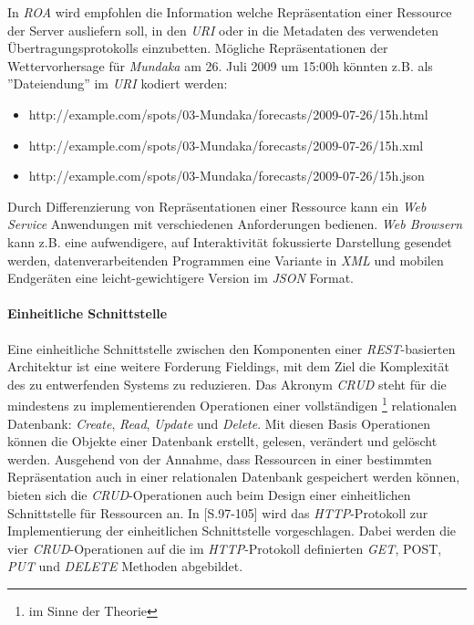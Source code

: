 In \textit{ROA} wird empfohlen die Information welche Repräsentation
einer Ressource der Server ausliefern soll, in den \textit{URI} oder
in die Metadaten des verwendeten Übertragungsprotokolls
einzubetten. Mögliche Repräsentationen der Wettervorhersage für
\textit{Mundaka} am 26. Juli 2009 um 15:00h könnten z.B. als
''Dateiendung'' im \textit{URI} kodiert werden:

\begin{itemize}
\item http://example.com/spots/03-Mundaka/forecasts/2009-07-26/15h.html
\item http://example.com/spots/03-Mundaka/forecasts/2009-07-26/15h.xml
\item http://example.com/spots/03-Mundaka/forecasts/2009-07-26/15h.json
\end{itemize}

Durch Differenzierung von Repräsentationen einer Ressource kann ein
\textit{Web Service} Anwendungen mit verschiedenen Anforderungen
bedienen. \textit{Web Browsern} kann z.B. eine aufwendigere, auf
Interaktivität fokussierte Darstellung gesendet werden,
datenverarbeitenden Programmen eine Variante in \textit{XML} und
mobilen Endgeräten eine leicht-gewichtigere Version im \textit{JSON}
Format.

\paragraph{Einheitliche Schnittstelle}

Eine einheitliche Schnittstelle zwischen den Komponenten einer
\textit{REST}-basierten Architektur ist eine weitere Forderung
Fieldings, mit dem Ziel die Komplexität des zu entwerfenden Systems zu
reduzieren. Das Akronym \textit{CRUD}  steht für die mindestens zu implementierenden
Operationen einer vollständigen \footnote{im Sinne der Theorie}
relationalen Datenbank: \textit{Create}, \textit{Read},
\textit{Update} und \textit{Delete}. Mit diesen Basis Operationen
können die Objekte einer Datenbank erstellt, gelesen, verändert und
gelöscht werden. Ausgehend von der Annahme, dass Ressourcen in einer
bestimmten Repräsentation auch in einer relationalen Datenbank
gespeichert werden können, bieten sich die \textit{CRUD}-Operationen
auch beim Design einer einheitlichen Schnittstelle für Ressourcen
an. In \cite{Richardson07}[S.97-105] wird das \textit{HTTP}-Protokoll
zur Implementierung der einheitlichen Schnittstelle
vorgeschlagen. Dabei werden die vier \textit{CRUD}-Operationen auf die
im \textit{HTTP}-Protokoll definierten \textit{GET}, \textup{POST},
\textit{PUT} und \textit{DELETE} Methoden abgebildet.

